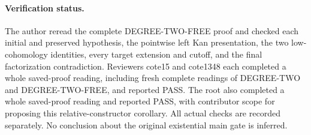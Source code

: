 \paragraph{Verification status.}
The author reread the complete DEGREE-TWO-FREE proof and checked
each initial and preserved hypothesis, the pointwise left Kan
presentation, the two low-cohomology identities, every target
extension and cutoff, and the final factorization contradiction.
Reviewers cote15 and cote1348 each completed a whole saved-proof
reading, including fresh complete readings of DEGREE-TWO and
DEGREE-TWO-FREE, and reported PASS. The root also completed a whole saved-proof reading and reported
PASS, with contributor scope for proposing this relative-constructor
corollary. All actual checks are recorded separately.
No conclusion about the original existential main gate is inferred.
